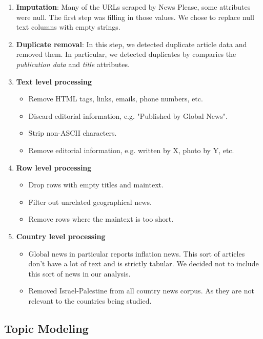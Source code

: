 \documentclass{article}
\theoremstyle{mytheoremstyle}
\theoremstyle{mytheoremstyle}
\theoremstyle{myproblemstyle}
\begin{document}
    \begin{enumerate}
        \item \textbf{Imputation}: Many of the URLs scraped by News Please, some attributes were null. The first step was filling in those values. We chose to replace null text columns with empty strings.
        \item \textbf{Duplicate removal}: In this step, we detected duplicate article data and removed them. In particular, we detected duplicates by comparies the \emph{publication data} and \emph{title} attributes.
        \item \textbf{Text level processing} \begin{itemize}
            \item Remove HTML tags, links, emails, phone numbers, etc.
            \item Discard editorial information, e.g. "Published by Global News".
            \item Strip non-ASCII characters.
            \item Remove editorial information, e.g. written by X, photo by Y, etc.
        \end{itemize}
        \item \textbf{Row level processing} \begin{itemize}
            \item Drop rows with empty titles and maintext.
            \item Filter out unrelated geographical news.
            \item Remove rows where the maintext is too short.
        \end{itemize}
        \item \textbf{Country level processing} \begin{itemize}
            \item Global news in particular reports inflation news. This sort of articles don't have a lot of text and is strictly tabular. We decided not to include this sort of news in our analysis.
            \item Removed Israel-Palestine from all country news corpus. As they are not relevant to the countries being studied.
        \end{itemize}
    \end{enumerate}

    \subsection{Topic Modeling}
\end{document}
